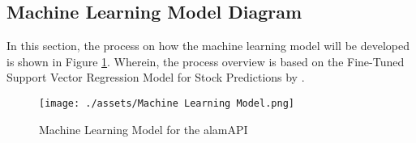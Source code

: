 \subsection{Machine Learning Model Diagram}
\label{subsec:ml_diagram}
In this section, the process on how the machine learning model 
will be developed is shown in Figure \ref{fig:ml_model}. 
Wherein, the process overview is based on the Fine-Tuned Support 
Vector Regression Model for Stock Predictions by 
.
\begin{figure}[ht]
    \centering
    \texttt{[image: ./assets/Machine Learning Model.png]}
    \caption{Machine Learning Model for the alamAPI}
    \label{fig:ml_model}
\end{figure}
\FloatBarrier